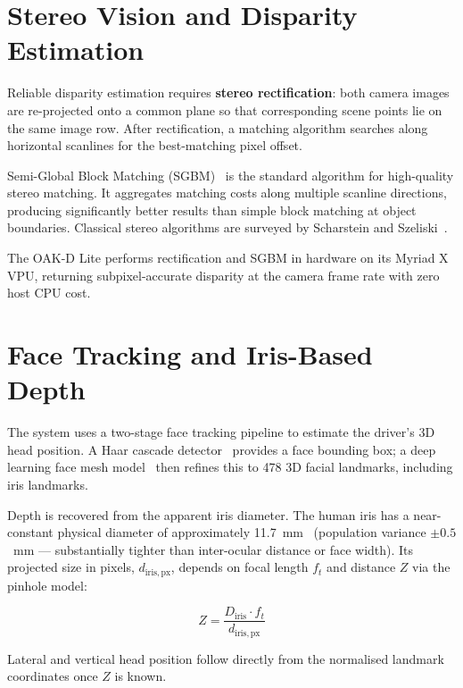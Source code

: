 \documentclass[11pt, a4paper]{report}
\begin{document}
\section{Stereo Vision and Disparity Estimation}
\label{sec:stereo}

Reliable disparity estimation requires \textbf{stereo rectification}:
both camera images are re-projected onto a common plane so that
corresponding scene points lie on the same image row.
After rectification, a matching algorithm searches along horizontal
scanlines for the best-matching pixel offset.

Semi-Global Block Matching (SGBM)~\cite{hirschmuller2005sgbm} is the
standard algorithm for high-quality stereo matching.
It aggregates matching costs along multiple scanline directions, producing
significantly better results than simple block matching at object
boundaries.
Classical stereo algorithms are surveyed by Scharstein and
Szeliski~\cite{scharstein2002taxonomy}.

The OAK-D Lite performs rectification and SGBM in hardware on its Myriad
X VPU, returning subpixel-accurate disparity at the camera frame rate
with zero host CPU cost.

\section{Face Tracking and Iris-Based Depth}
\label{sec:facetrack}

The system uses a two-stage face tracking pipeline to estimate the
driver's 3D head position.
A Haar cascade detector~\cite{viola2004robust} provides a face bounding
box; a deep learning face mesh model~\cite{kartynnik2019facemesh} then
refines this to 478 3D facial landmarks, including iris landmarks.

Depth is recovered from the apparent iris diameter.
The human iris has a near-constant physical diameter of approximately
11.7~mm~\cite{bergmanson2017iris} (population variance $\pm 0.5$~mm ---
substantially tighter than inter-ocular distance or face width).
Its projected size in pixels, $d_{\mathrm{iris,px}}$, depends on focal
length $f_t$ and distance $Z$ via the pinhole model:

\begin{equation}
    Z = \frac{D_{\mathrm{iris}} \cdot f_t}{d_{\mathrm{iris,px}}}
    \label{eq:iris_depth}
\end{equation}

Lateral and vertical head position follow directly from the normalised
landmark coordinates once $Z$ is known.
\end{document}
